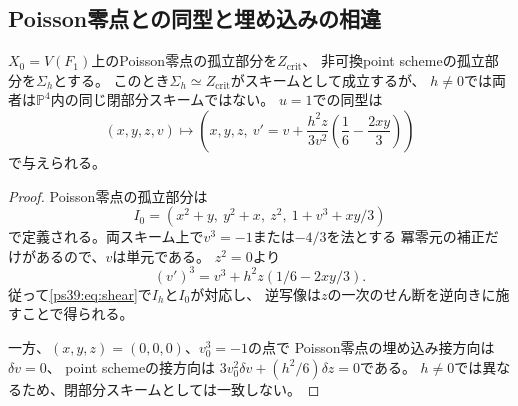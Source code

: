 \subsection{Poisson零点との同型と埋め込みの相違}
\begin{theorem}[孤立部分の比較]\label{ps39:thm:comparison}
$X_0=V(F_1)$上のPoisson零点の孤立部分を$Z_{\mathrm{crit}}$、
非可換point schemeの孤立部分を$\Sigma_h$とする。
このとき$\Sigma_h\simeq Z_{\mathrm{crit}}$がスキームとして成立するが、
$h\ne0$では両者は$\mathbb P^4$内の同じ閉部分スキームではない。
$u=1$での同型は
\begin{equation}\label{ps39:eq:shear}
(x,y,z,v)\longmapsto
\left(x,y,z,\
v'=v+\frac{h^2z}{3v^2}
 \left(\frac16-\frac{2xy}{3}\right)\right)
\end{equation}
で与えられる。
\end{theorem}
\begin{proof}
Poisson零点の孤立部分は
\[
I_0=(x^2+y,\ y^2+x,\ z^2,\ 1+v^3+xy/3)
\]
で定義される。両スキーム上で$v^3=-1$または$-4/3$を法とする
冪零元の補正だけがあるので、$v$は単元である。
$z^2=0$より
\[
(v')^3=v^3+h^2z(1/6-2xy/3).
\]
従って\eqref{ps39:eq:shear}で$I_h$と$I_0$が対応し、
逆写像は$z$の一次のせん断を逆向きに施すことで得られる。

一方、$(x,y,z)=(0,0,0)$、$v_0^3=-1$の点で
Poisson零点の埋め込み接方向は$\delta v=0$、
point schemeの接方向は
$3v_0^2\delta v+(h^2/6)\delta z=0$である。
$h\ne0$では異なるため、閉部分スキームとしては一致しない。
\end{proof}

